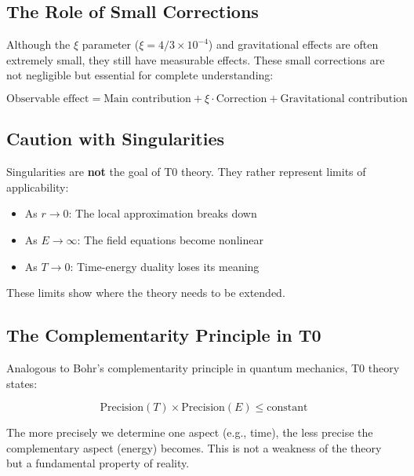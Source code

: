 	\subsection{The Role of Small Corrections}
	
	Although the $\xi$ parameter ($\xi = 4/3 \times 10^{-4}$) and gravitational effects are often extremely small, they still have measurable effects. These small corrections are not negligible but essential for complete understanding:
	
	\begin{equation}
		\text{Observable effect} = \text{Main contribution} + \xi \cdot \text{Correction} + \text{Gravitational contribution}
	\end{equation}
	
	\subsection{Caution with Singularities}
	
	\begin{tcolorbox}[colback=t0yellow!10!white, colframe=t0yellow!75!black, title=Important Insight]
		Singularities are \textbf{not} the goal of T0 theory. They rather represent limits of applicability:
		\begin{itemize}
			\item As $r \to 0$: The local approximation breaks down
			\item As $E \to \infty$: The field equations become nonlinear
			\item As $T \to 0$: Time-energy duality loses its meaning
		\end{itemize}
		These limits show where the theory needs to be extended.
	\end{tcolorbox}
	
	\subsection{The Complementarity Principle in T0}
	
	Analogous to Bohr's complementarity principle in quantum mechanics, T0 theory states:
	
	\begin{equation}
		\text{Precision}(T) \times \text{Precision}(E) \leq \text{constant}
	\end{equation}
	
	The more precisely we determine one aspect (e.g., time), the less precise the complementary aspect (energy) becomes. This is not a weakness of the theory but a fundamental property of reality.
	
